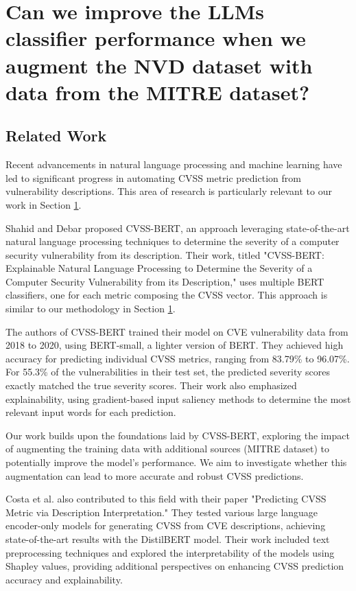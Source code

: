 \documentclass[12pt]{article}
\begin{document}
\section{Can we improve the LLMs classifier performance when we augment the NVD dataset with data
  from the MITRE dataset?}\label{cvss_prediction}

\subsection{Related Work}

Recent advancements in natural language processing and machine learning have led to significant
progress in automating CVSS metric prediction from vulnerability descriptions. This area of research
is particularly relevant to our work in Section \ref{cvss_prediction}.

Shahid and Debar \cite{cvss_bert} proposed CVSS-BERT, an approach leveraging state-of-the-art
natural language processing techniques to determine the severity of a computer security
vulnerability from its description. Their work, titled "CVSS-BERT: Explainable Natural Language
Processing to Determine the Severity of a Computer Security Vulnerability from its Description,"
uses multiple BERT classifiers, one for each metric composing the CVSS vector. This approach is
similar to our methodology in Section \ref{cvss_prediction}.

The authors of CVSS-BERT trained their model on CVE vulnerability data from 2018 to 2020, using
BERT-small, a lighter version of BERT. They achieved high accuracy for predicting individual CVSS
metrics, ranging from 83.79\% to 96.07\%. For 55.3\% of the vulnerabilities in their test set, the
predicted severity scores exactly matched the true severity scores. Their work also emphasized
explainability, using gradient-based input saliency methods to determine the most relevant input
words for each prediction.

Our work builds upon the foundations laid by CVSS-BERT, exploring the impact of augmenting the
training data with additional sources (MITRE dataset) to potentially improve the model's
performance. We aim to investigate whether this augmentation can lead to more accurate and robust
CVSS predictions.

Costa et al. \cite{costa} also contributed to this field with their paper "Predicting CVSS Metric
via Description Interpretation." They tested various large language encoder-only models for
generating CVSS from CVE descriptions, achieving state-of-the-art results with the DistilBERT model.
Their work included text preprocessing techniques and explored the interpretability of the models
using Shapley values, providing additional perspectives on enhancing CVSS prediction accuracy and
explainability.
\end{document}
